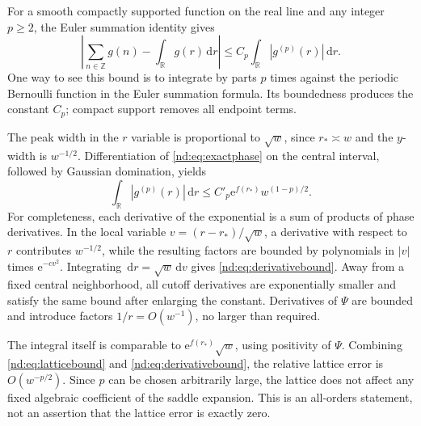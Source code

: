 \documentclass[11pt,a4paper,oneside,openany]{book}
\numberwithin{equation}{chapter}
\theoremstyle{definition}
\theoremstyle{remark}
\newcommand{\ZZ}{\mathbb Z}
\newcommand{\RR}{\mathbb R}
\newcommand{\dd}{\,\mathrm d}
\newcommand{\e}{\mathrm e}
\begin{document}
For a smooth compactly supported function on the real line and any integer
\(p\ge2\), the Euler summation identity gives
\begin{equation}
 \left|\sum_{n\in\ZZ}g(n)-\int_\RR g(r)\dd r\right|
 \le C_p\int_\RR|g^{(p)}(r)|\dd r.
 \label{nd:eq:latticebound}
\end{equation}
One way to see this bound is to integrate by parts \(p\) times against the
periodic Bernoulli function in the Euler summation formula. Its boundedness
produces the constant \(C_p\); compact support removes all endpoint terms.

The peak width in the \(r\) variable is proportional to \(\sqrt w\), since
\(r_*\asymp w\) and the \(y\)-width is \(w^{-1/2}\). Differentiation of
\eqref{nd:eq:exactphase} on the central interval, followed by Gaussian domination,
yields
\begin{equation}
 \int_\RR|g^{(p)}(r)|\dd r
 \le C'_p\e^{f(r_*)}w^{(1-p)/2}.
 \label{nd:eq:derivativebound}
\end{equation}
For completeness, each derivative of the exponential is a sum of products of
phase derivatives. In the local variable \(v=(r-r_*)/\sqrt w\), a derivative
with respect to \(r\) contributes \(w^{-1/2}\), while the resulting factors
are bounded by polynomials in \(|v|\) times \(\e^{-c v^2}\). Integrating
\(\dd r=\sqrt w\dd v\) gives \eqref{nd:eq:derivativebound}. Away from a fixed
central neighborhood, all cutoff derivatives are exponentially smaller and
satisfy the same bound after enlarging the constant. Derivatives of \(\Psi\)
are bounded and introduce factors \(1/r=O(w^{-1})\), no larger than required.

The integral itself is comparable to \(\e^{f(r_*)}\sqrt w\), using positivity
of \(\Psi\). Combining \eqref{nd:eq:latticebound} and
\eqref{nd:eq:derivativebound}, the relative lattice error is \(O(w^{-p/2})\).
Since \(p\) can be chosen arbitrarily large, the lattice does not affect any
fixed algebraic coefficient of the saddle expansion. This is an all-orders
statement, not an assertion that the lattice error is exactly zero.
\end{document}
